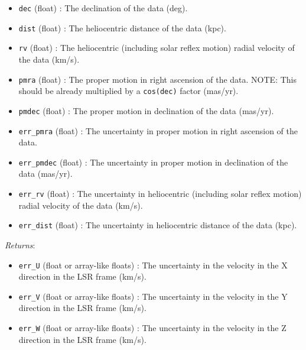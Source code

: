 \documentclass{article}
\begin{document}
\begin{itemize}
\begin{itemize}
\item \verb!dec! (float) : The declination of the data (deg).

\item \verb!dist! (float) : The heliocentric distance of the data (kpc).

\item \verb!rv! (float) : The heliocentric (including solar reflex motion) radial velocity of the data (km/s).

\item \verb!pmra! (float) : The proper motion in right ascension of the data. NOTE: This should be already multiplied by a \verb!cos(dec)! factor (mas/yr). 

\item \verb!pmdec! (float) : The proper motion in declination of the data (mas/yr).

\item \verb!err_pmra! (float) : The uncertainty in proper motion in right ascension of the data.

\item \verb!err_pmdec! (float) : The uncertainty in proper motion in declination of the data (mas/yr).

\item \verb!err_rv! (float) : The uncertainty in heliocentric (including solar reflex motion) radial velocity of the data (km/s).

\item \verb!err_dist! (float) : The uncertainty in heliocentric distance of the data (kpc).

\end{itemize}

\textit{Returns}: \begin{itemize}

\item \verb!err_U! (float or array-like floats) : The uncertainty in the velocity in the X direction in the LSR frame (km/s).

\item \verb!err_V! (float or array-like floats) : The uncertainty in the velocity in the Y direction in the LSR frame (km/s).

\item \verb!err_W! (float or array-like floats) : The uncertainty in the  velocity in the Z direction in the LSR frame (km/s).

\end{itemize}




\end{itemize}
\end{document}
